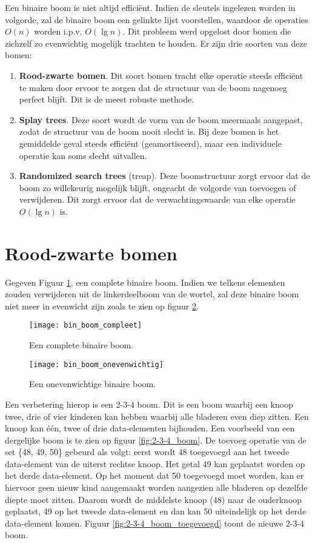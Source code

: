 \documentclass{report}
\begin{document}
	Een binaire boom is niet altijd efficiënt. Indien de sleutels ingelezen worden in volgorde, zal de binaire boom een gelinkte lijst voorstellen, waardoor de operaties $O(n)$ worden i.p.v. $O(\lg n)$.
	Dit probleem werd opgelost door bomen die zichzelf zo evenwichtig mogelijk trachten te houden. Er zijn drie soorten van deze bomen:
	\begin{enumerate}
		\item \textbf{Rood-zwarte bomen}. Dit soort bomen tracht elke operatie steeds efficiënt te maken door ervoor te zorgen dat de structuur van de boom nagenoeg perfect blijft. Dit is de meest robuste methode.
		\item \textbf{Splay trees}. Deze soort wordt de vorm van de boom meermaals aangepast, zodat de structuur van de boom nooit slecht is. Bij deze bomen is het gemiddelde geval steeds efficiënt (geamortiseerd), maar een individuele operatie kan soms slecht uitvallen.
		\item \textbf{Randomized search trees} (treap). Deze boomstructuur zorgt ervoor dat de boom zo willekeurig mogelijk blijft, ongeacht de volgorde van toevoegen of verwijderen. Dit zorgt ervoor dat de verwachtingswaarde van elke operatie $O(\lg n)$ is.
	\end{enumerate}
	\section{Rood-zwarte bomen}
	Gegeven Figuur \ref{fig:bin_boom_compleet}, een complete binaire boom. Indien we telkens elementen zouden verwijderen uit de linkerdeelboom van de wortel, zal deze binaire boom niet meer in evenwicht zijn zoals te zien op figuur \ref{fig:bin_boom_onevenwichtig}.
	
	\begin{figure}[h]
		\centering
		\texttt{[image: bin\_boom\_compleet]}
		\caption{Een complete binaire boom.}
		\label{fig:bin_boom_compleet}
	\end{figure}

	\begin{figure}[h]
		\centering
		\texttt{[image: bin\_boom\_onevenwichtig]}
		\caption{Een onevenwichtige binaire boom.}
		\label{fig:bin_boom_onevenwichtig}
	\end{figure}

	Een verbetering hierop is een 2-3-4 boom. Dit is een boom waarbij een knoop twee, drie of vier kinderen kan hebben waarbij alle bladeren even diep zitten. Een knoop kan één, twee of drie data-elementen bijhouden. Een voorbeeld van een dergelijke boom is te zien op figuur \ref{fig:2-3-4_boom}. De toevoeg operatie van de set \{48, 49, 50\} gebeurd als volgt: eerst wordt 48 toegevoegd aan het tweede data-element van de uiterst rechtse knoop. Het getal 49 kan geplaatst worden op het derde data-element. Op het moment dat 50 toegevoegd moet worden, kan er hiervoor geen nieuw kind aangemaakt worden aangezien alle bladeren op dezelfde diepte moet zitten. Daarom wordt de middelste knoop (48) naar de ouderknoop geplaatst, 49 op het tweede data-element en dan kan 50 uiteindelijk op het derde data-element komen. Figuur \ref{fig:2-3-4_boom_toegevoegd} toont de nieuwe 2-3-4 boom.
	
\end{document}

